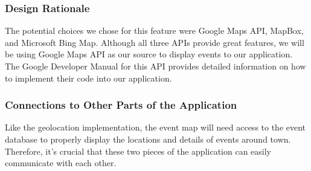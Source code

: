 \documentclass[draftclsnofoot, onecolumn, 10pt, compsoc]{IEEEtran}
\begin{document}
			\subsubsection{Design Rationale}
				The potential choices we chose for this feature were Google Maps API, MapBox, and Microsoft Bing Map. Although all three APIs provide great features, we will be using Google Maps API as our source to display events to our application. The Google Developer Manual for this API provides detailed information on how to implement their code into our application.
				~\cite{GoogleMap}
			\subsubsection{Connections to Other Parts of the Application}
				Like the geolocation implementation, the event map will need access to the event database to properly display the locations and details of events around town. Therefore, it's crucial that these two pieces of the application can easily communicate with each other.

	
	
\end{document}

